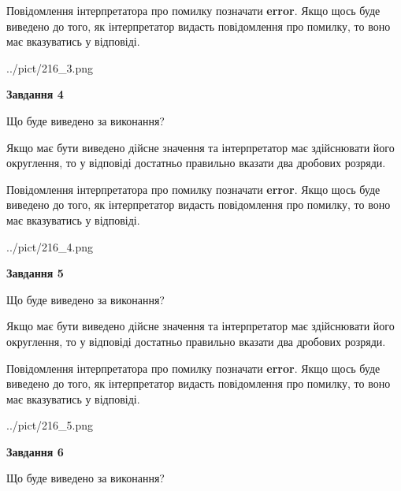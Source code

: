 \documentclass[12pt, ukrainian]{article}
\begin{document}
{\begin {Large}
Повідомлення інтерпретатора про помилку позначати \textbf{error}.
Якщо щось буде виведено до того, як інтерпретатор видасть повідомлення про помилку, 
то воно має вказуватись у відповіді. \par

\begin{center}
	{../pict/216_3.png}
\end{center}
\newpage

{\begin {center}\textbf{Завдання 4}\end {center}}\par
Що буде виведено за виконання? \par

Якщо має бути виведено дійсне значення та інтерпретатор має здійснювати його округлення, 
то у відповіді достатньо правильно вказати два дробових розряди.

Повідомлення інтерпретатора про помилку позначати \textbf{error}.
Якщо щось буде виведено до того, як інтерпретатор видасть повідомлення про помилку, 
то воно має вказуватись у відповіді. \par

\begin{center}
	{../pict/216_4.png}
\end{center}
\newpage

{\begin {center}\textbf{Завдання 5}\end {center}}\par
Що буде виведено за виконання? \par

Якщо має бути виведено дійсне значення та інтерпретатор має здійснювати його округлення, 
то у відповіді достатньо правильно вказати два дробових розряди.

Повідомлення інтерпретатора про помилку позначати \textbf{error}.
Якщо щось буде виведено до того, як інтерпретатор видасть повідомлення про помилку, 
то воно має вказуватись у відповіді. \par

\begin{center}
	{../pict/216_5.png}
\end{center}
\newpage

{\begin {center}\textbf{Завдання 6}\end {center}}\par
Що буде виведено за виконання? \par


\end{Large}}
\end{document}
